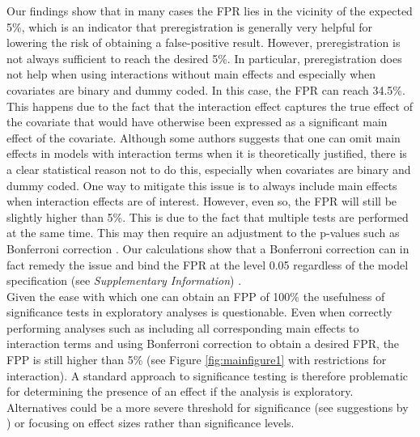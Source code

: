 
Our findings show that in many cases the FPR lies in the vicinity of the expected 5\%, which is an indicator that preregistration is generally very helpful for lowering the risk of obtaining a false-positive result. However, preregistration is not always sufficient to reach the desired 5\%. In particular, preregistration does not help when using interactions without main effects and especially when covariates are binary and dummy coded. In this case, the FPR can reach 34.5\%. This happens due to the fact that the interaction effect captures the true effect of the covariate that would have otherwise been expressed as a significant main effect of the covariate. Although some authors suggests that one can omit main effects in models with interaction terms when it is theoretically justified, there is a clear statistical reason not to do this, especially when covariates are binary and dummy coded. One way to mitigate this issue is to always include main effects when interaction effects are of interest. However, even so, the FPR will still be slightly higher than 5\%. This is due to the fact that multiple tests are performed at the same time. This may then require an adjustment to the p-values such as Bonferroni correction \citep{dunn1961multiple}. Our calculations show that a Bonferroni correction can in fact remedy the issue and bind the FPR at the level 0.05 regardless of the model specification (see \textit{Supplementary Information}) . \\

Given the ease with which one can obtain an FPP of 100\% the usefulness of significance tests in exploratory analyses is questionable. Even when correctly performing analyses such as including all corresponding main effects to interaction terms and using Bonferroni correction to obtain a desired FPR, the FPP is still higher than 5\% (see Figure \ref{fig:mainfigure1} with restrictions for interaction). A standard approach to significance testing is therefore problematic for determining the presence of an effect if the analysis is exploratory. Alternatives could be a more severe threshold for significance (see suggestions by \cite{benjamin2018}) or focusing on effect sizes rather than significance levels. \\
    
